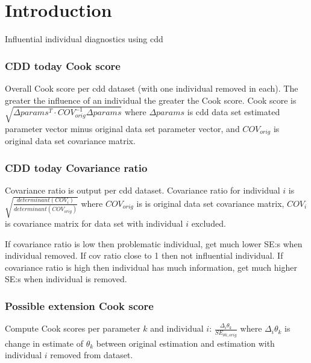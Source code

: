 \documentclass[a4wide,12pt]{article}
\date{#1}
\title{#1\\ }
\date{Revised #2}
\renewcommand{\_}{\textscale{.7}{\textunderscore}}
\begin{document}
\maketitle
\newcommand{\guidetoolname}{new vpc}


\section{Introduction}
Influential individual diagnostics using cdd

\subsubsection*{CDD today Cook score}
Overall Cook score per cdd dataset (with one individual
removed in each). The greater the influence of an individual the greater the
Cook score. Cook score is
$\sqrt{\Delta params^T\cdot COV_{orig}^{-1}\Delta params}$ where $\Delta params$
is cdd data set estimated parameter vector minus
original data set parameter vector, and $COV_{orig}$ 
is original data set covariance matrix.

\subsubsection*{CDD today Covariance ratio}
Covariance ratio is output per cdd dataset. Covariance ratio for
individual $i$ is $\sqrt{\frac{determinant(COV_{i})}{determinant(COV_{orig})}}$
where $COV_{orig}$ is 
is original data set covariance matrix, $COV_{i}$ is covariance matrix
for data set with individual $i$ excluded.

If covariance ratio is low then problematic individual, get much lower SE:s
when individual removed. If cov ratio close to 1 then not influential
individual. If covariance ratio is high then individual has much information,
get much higher SE:s when individual is removed.


\subsubsection*{Possible extension Cook score}
Compute Cook scores per parameter $k$ and individual $i$: 
$\frac{\Delta_i \theta_k}{SE_{\theta k,orig}}$ 
where $\Delta_i \theta_k$ is change in estimate of $\theta_k$ between original
estimation and estimation with individual $i$ removed from dataset.
\end{document}

